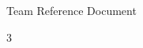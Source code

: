 \documentclass[9pt,a4paper]{extarticle}
\begin{document}
\pagestyle{empty}
\setcounter{page}{0}
\begin{center}
  \strut\vspace{3cm}\par
  {\fontsize{25}{30}\selectfont\TeamBookSubtitle\par}
  \vspace{0.5cm}
  {\fontsize{60}{60}\selectfont\TeamBookTitle\par}
  \vfill
  {\fontsize{21}{25}\selectfont Team Reference Document\par}
  \vspace{1cm}
\end{center}
\clearpage
\pagestyle{fancy}
\begin{multicols*}{3}
  
\end{multicols*}
\end{document}

